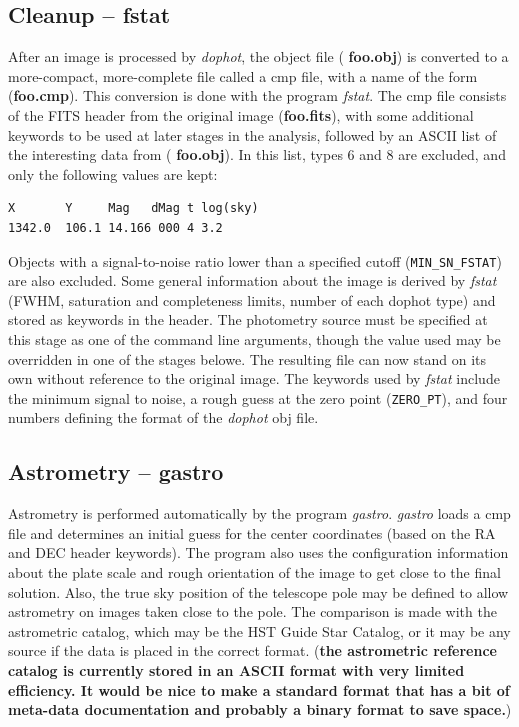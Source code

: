 \documentclass{article}
\newcommand{\note}[1]{({\bf #1})}
\newcommand\pr{\em}                   %
\newcommand\ff{\bf}                   %
\newcommand\cc{\tt}                   %
\newcommand\ty{\sc}                   %
\begin{document}
\subsection{Cleanup -- fstat}

After an image is processed by {\pr dophot}, the object file ({\ff
foo.obj}) is converted to a more-compact, more-complete file called a
{\ty cmp} file, with a name of the form ({\ff foo.cmp}).  This
conversion is done with the program {\pr fstat}.  The {\ty cmp} file
consists of the FITS header from the original image ({\ff foo.fits}),
with some additional keywords to be used at later stages in the
analysis, followed by an ASCII list of the interesting data from ({\ff
foo.obj}).  In this list, types 6 and 8 are excluded, and only the
following values are kept:
\begin{verbatim}
X       Y     Mag   dMag t log(sky) 
1342.0  106.1 14.166 000 4 3.2
\end{verbatim}
Objects with a signal-to-noise ratio lower than a specified cutoff
({\cc MIN\_SN\_FSTAT}) are also excluded.  Some general information
about the image is derived by {\pr fstat} (FWHM, saturation and
completeness limits, number of each dophot type) and stored as
keywords in the header.  The photometry source must be specified at
this stage as one of the command line arguments, though the value used
may be overridden in one of the stages belowe.  The resulting file can
now stand on its own without reference to the original image.  The
keywords used by {\pr fstat} include the minimum signal to noise, a
rough guess at the zero point ({\cc ZERO\_PT}), and four numbers
defining the format of the {\pr dophot} {\ty obj} file.

\subsection{Astrometry -- gastro}

Astrometry is performed automatically by the program {\pr gastro}.
{\pr gastro} loads a {\ty cmp} file and determines an initial guess
for the center coordinates (based on the RA and DEC header keywords).
The program also uses the configuration information about the plate
scale and rough orientation of the image to get close to the final
solution.  Also, the true sky position of the telescope pole may be
defined to allow astrometry on images taken close to the pole.  The
comparison is made with the astrometric catalog, which may be the HST
Guide Star Catalog, or it may be any source if the data is placed in
the correct format.  \note{the astrometric reference catalog
is currently stored in an ASCII format with very limited efficiency.
It would be nice to make a standard format that has a bit of meta-data
documentation and probably a binary format to save space.}
\end{document}
